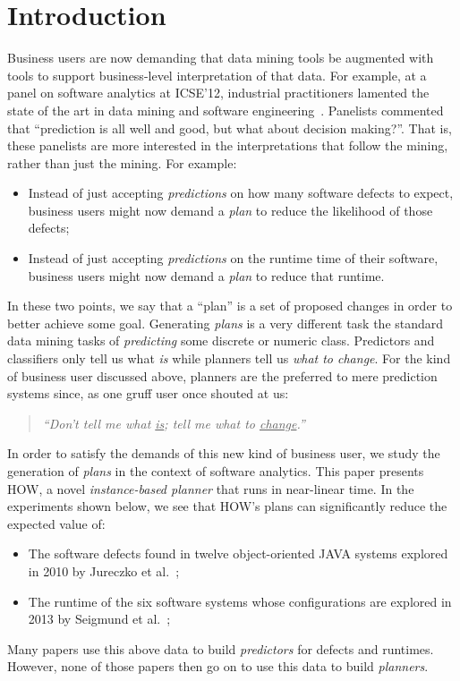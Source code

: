 \documentclass[conference]{IEEEtran}
\newcommand{\bi}{\begin{itemize}}
\newcommand{\ei}{\end{itemize}}
\begin{document}
\section{Introduction}
Business  users are now demanding that data mining tools
be augmented with tools to support  business-level
interpretation of that data. For example,
at a  panel on software analytics at ICSE'12,
industrial practitioners lamented the state of the art in data mining
and software engineering~\cite{menzies12a}. Panelists commented that
``prediction is all well and good, but what about decision
making?''. That is, these panelists are more interested in the interpretations
that follow the mining, rather than just  the mining. For example:
\bi
\item Instead of just accepting  {\em predictions} on how many 
 software defects
to expect,  business users might now demand a {\em plan} to
reduce the likelihood of those defects;
\item Instead of just accepting {\em predictions} on the runtime
time of their software, business users might now demand
a {\em plan} to reduce that runtime.
\ei
In these two points, we say that a ``plan'' is a  set of proposed changes in order to better achieve some goal. 
Generating {\em plans} is a  very different task the standard
data mining tasks of {\em predicting} some discrete or numeric class.
Predictors
and classifiers only tell us what {\em is} while planners 
  tell us {\em what to change}. For the kind of business user
discussed above, planners are the preferred to mere prediction systems
since, as one gruff user once shouted at us:
\begin{quote}
{\em ``Don't tell me what \underline{is};
tell me what to \underline{change}.''}
\end{quote}
In order to satisfy the demands of this new kind of business user, we  study the generation of {\em plans} in the context
of software analytics.  
This paper presents
HOW, a novel  {\em instance-based planner} that runs in near-linear time.
In the experiments shown below, we see that HOW's plans can
significantly reduce the expected
value of:
\bi
\item The software defects found in  twelve object-oriented JAVA systems explored in 2010 by Jureczko et al.~\cite{jureczko10};
\item The runtime of the six software systems whose configurations
are explored in 2013 by Seigmund et al.~\cite{sven12};
\ei
Many papers use this above data to build {\em predictors} for defects and runtimes.
However, none of those papers then go on to use this data to build {\em planners}.
\end{document}
